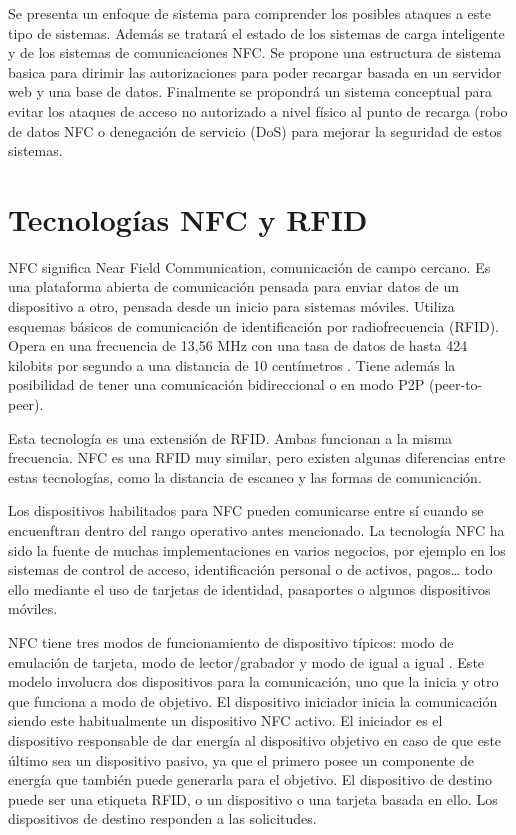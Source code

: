 \documentclass[12pt,a4paper,onecolumn,oneside]{report}
\begin{document}
Se presenta un enfoque de sistema para comprender los posibles ataques a este tipo de sistemas. Además se tratará el estado de los sistemas de carga inteligente y de los sistemas de comunicaciones NFC. Se propone una estructura de sistema basica para dirimir las autorizaciones para poder recargar basada en un servidor web y una base de datos. Finalmente se propondrá un sistema conceptual para evitar los ataques de acceso no autorizado a nivel físico al punto de recarga (robo de datos NFC o denegación de servicio (DoS) para mejorar la seguridad de estos sistemas.




\chapter{Tecnologías NFC y RFID}
\label{Tecnologías NFC y RFID}

NFC significa Near Field Communication, comunicación de campo cercano. Es una plataforma abierta de comunicación pensada para enviar datos de un dispositivo a otro, pensada desde un inicio para sistemas móviles. Utiliza esquemas básicos de comunicación de identificación por radiofrecuencia (RFID). Opera en una frecuencia de 13,56 MHz con una tasa de datos de hasta 424 kilobits por segundo a una distancia de 10 centímetros \cite{uno}. Tiene además la posibilidad de tener una comunicación bidireccional o en modo P2P (peer-to-peer).

Esta tecnología es una extensión de RFID. Ambas funcionan a la misma frecuencia. NFC es una RFID muy similar, pero existen algunas diferencias entre estas tecnologías, como la distancia de escaneo y las formas de comunicación. 

Los dispositivos habilitados para NFC pueden comunicarse entre sí cuando se encuenftran dentro del rango operativo antes mencionado. La tecnología NFC ha sido la fuente de muchas implementaciones en varios negocios, por ejemplo en los sistemas de control de acceso, identificación personal o de activos, pagos… todo ello mediante el uso de tarjetas de identidad, pasaportes o algunos dispositivos móviles.

NFC tiene tres modos de funcionamiento de dispositivo típicos: modo de emulación de tarjeta, modo de lector/grabador y modo de igual a igual \cite{tres}. Este modelo involucra dos dispositivos para la comunicación, uno que la inicia y otro que funciona a modo de objetivo. El dispositivo iniciador inicia la comunicación siendo este habitualmente un dispositivo NFC activo. El iniciador es el dispositivo responsable de dar energía al dispositivo objetivo en caso de que este último sea un dispositivo pasivo, ya que el primero posee un componente de energía que también puede generarla para el objetivo. El dispositivo de destino puede ser una etiqueta RFID, o un dispositivo o una tarjeta basada en ello. Los dispositivos de destino responden a las solicitudes.
\end{document}
